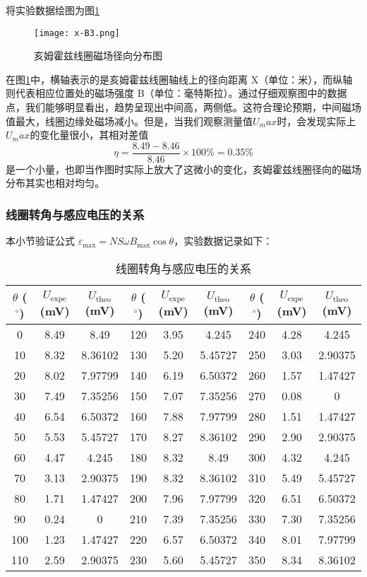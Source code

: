 \documentclass[11pt]{article}
\begin{document}
	将实验数据绘图为图\ref{fig:x-B3}
	\begin{figure}[H]
		\centering
		\texttt{[image: x-B3.png]}
		\caption{亥姆霍兹线圈磁场径向分布图}
		\label{fig:x-B3}
	\end{figure}
	
	在图\ref{fig:x-B3}中，横轴表示的是亥姆霍兹线圈轴线上的径向距离 X（单位：米），而纵轴则代表相应位置处的磁场强度 B（单位：毫特斯拉）。通过仔细观察图中的数据点，我们能够明显看出，趋势呈现出中间高，两侧低。这符合理论预期，中间磁场值最大，线圈边缘处磁场减小。但是，当我们观察测量值$U_max$时，会发现实际上$U_max$的变化量很小，其相对差值
	\[\eta=\frac{8.49-8.46}{8.46} \times 100 \%= 0.35\%\]
	是一个小量，也即当作图时实际上放大了这微小的变化，亥姆霍兹线圈径向的磁场分布其实也相对均匀。
	
	
	\subsubsection{线圈转角与感应电压的关系}
	本小节验证公式 $ \varepsilon_{\max}=NS\omega B_{\max}\cos\theta $，实验数据记录如下：
	\begin{table}[H]\centering
		\caption{线圈转角与感应电压的关系}
		\label{线圈转角与感应电压的关系}
		\begin{tabular}{ccc|ccc|ccc}\toprule
			$\theta$ ($^\circ$) & $U_{\text{expe}}$ (mV) & $U_{\text{theo}}$ (mV) & $\theta$ ($^\circ$) & $U_{\text{expe}}$ (mV) & $U_{\text{theo}}$ (mV) & $\theta$ ($^\circ$) & $U_{\text{expe}}$ (mV) & $U_{\text{theo}}$ (mV)   \\
			\midrule
			0    & 8.49 & 8.49 & 120  & 3.95 & 4.245 & 240  & 4.28 & 4.245 \\
			10   & 8.32 & 8.36102 & 130  & 5.20 & 5.45727 & 250  & 3.03 & 2.90375 \\
			20   & 8.02 & 7.97799 & 140  & 6.19 & 6.50372 & 260  & 1.57 & 1.47427 \\
			30   & 7.49 & 7.35256 & 150  & 7.07 & 7.35256 & 270  & 0.08 & 0 \\
			40   & 6.54 & 6.50372 & 160  & 7.88 & 7.97799 & 280  & 1.51 & 1.47427 \\
			50   & 5.53 & 5.45727 & 170  & 8.27 & 8.36102 & 290  & 2.90 & 2.90375 \\
			60   & 4.47 & 4.245 & 180  & 8.32 & 8.49 & 300  & 4.32 & 4.245 \\
			70   & 3.13 & 2.90375 & 190  & 8.32 & 8.36102 & 310  & 5.49 & 5.45727 \\
			80   & 1.71 & 1.47427 & 200  & 7.96 & 7.97799 & 320  & 6.51 & 6.50372 \\
			90   & 0.24 & 0 & 210  & 7.39 & 7.35256 & 330  & 7.30 & 7.35256 \\
			100  & 1.23 & 1.47427 & 220  & 6.57 & 6.50372 & 340  & 8.01 & 7.97799 \\
			110  & 2.59 & 2.90375 & 230  & 5.60 & 5.45727 & 350  & 8.34 & 8.36102 \\
			\bottomrule
		\end{tabular}
	\end{table}
	
\end{document}
